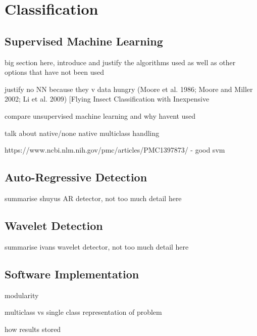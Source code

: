 \section{Classification}
\label{sec:pl-clf}

    \subsection{Supervised Machine Learning}
    \label{subsec:pl-clf-sup}
        \begin{sitemize}
            \item{big section here, introduce and justify the algorithms used as well as other options that have not been used}
            \item{justify no NN because they v data hungry  (Moore et al. 1986; Moore and Miller 2002; Li et al. 2009) [Flying Insect Classification with Inexpensive}
            \item{compare unsupervised machine learning and why havent used}
            \item{talk about native/none native multiclass handling}
            \item{https://www.ncbi.nlm.nih.gov/pmc/articles/PMC1397873/ - good svm}
        \end{sitemize}
    
    \subsection{Auto-Regressive Detection}
    \label{subsec:pl-clf-ar}
        \begin{sitemize}
            \item{summarise shuyus AR detector, not too much detail here}
        \end{sitemize}
    
    \subsection{Wavelet Detection}
    \label{subsec:pl-clf-wavelet}
        \begin{sitemize}
            \item{summarise ivans wavelet detector, not too much detail here}
        \end{sitemize}

    \subsection{Software Implementation}
    \label{subsec:pl-clf-software}
        \begin{sitemize}
            \item{modularity}
            \item{multiclass vs single class representation of problem}
            \item{how results stored}
        \end{sitemize}